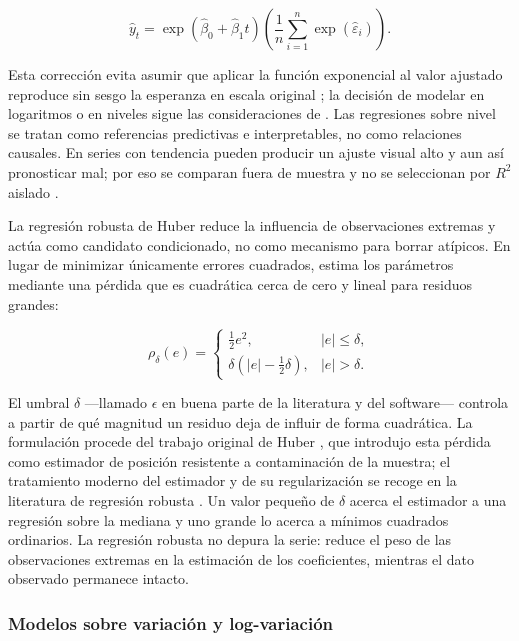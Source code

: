 \documentclass[12pt,letterpaper]{article}
\providecommand{\parencite}{\citep}
\begin{document}
\begin{equation}
\hat{y}_t=\exp(\hat{\beta}_0+\hat{\beta}_1t)
\left(\frac{1}{n}\sum_{i=1}^{n}\exp(\hat{\varepsilon}_i)\right).
\end{equation}

Esta corrección evita asumir que aplicar la función exponencial al valor ajustado reproduce sin sesgo la esperanza en escala original \parencite{duan1983}; la decisión de modelar en logaritmos o en niveles sigue las consideraciones de \parencite{manning_mullahy2001}. Las regresiones sobre nivel se tratan como referencias predictivas e interpretables, no como relaciones causales. En series con tendencia pueden producir un ajuste visual alto y aun así pronosticar mal; por eso se comparan fuera de muestra y no se seleccionan por \(R^2\) aislado \parencite{granger_newbold1974,springer_spurious_regressions}.

La regresión robusta de Huber reduce la influencia de observaciones extremas y actúa como candidato condicionado, no como mecanismo para borrar atípicos. En lugar de minimizar únicamente errores cuadrados, estima los parámetros mediante una pérdida que es cuadrática cerca de cero y lineal para residuos grandes:

\begin{equation}
\rho_{\delta}(e)=
\begin{cases}
\frac{1}{2}e^2, & |e|\leq\delta,\\
\delta\left(|e|-\frac{1}{2}\delta\right), & |e|>\delta.
\end{cases}
\end{equation}

El umbral \(\delta\) ---llamado \(\epsilon\) en buena parte de la literatura y del software--- controla a partir de qué magnitud un residuo deja de influir de forma cuadrática. La formulación procede del trabajo original de Huber \parencite{huber1964}, que introdujo esta pérdida como estimador de posición resistente a contaminación de la muestra; el tratamiento moderno del estimador y de su regularización se recoge en la literatura de regresión robusta \parencite{penn_state_robust_regression}. Un valor pequeño de \(\delta\) acerca el estimador a una regresión sobre la mediana y uno grande lo acerca a mínimos cuadrados ordinarios. La regresión robusta no depura la serie: reduce el peso de las observaciones extremas en la estimación de los coeficientes, mientras el dato observado permanece intacto.

\subsubsection{Modelos sobre variación y log-variación}
\end{document}
